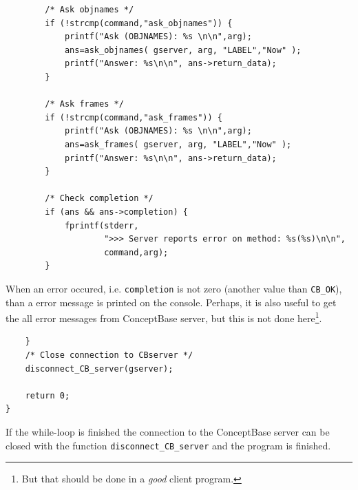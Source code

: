 \begin{verbatim}
        /* Ask objnames */
        if (!strcmp(command,"ask_objnames")) {
            printf("Ask (OBJNAMES): %s \n\n",arg);
            ans=ask_objnames( gserver, arg, "LABEL","Now" );
            printf("Answer: %s\n\n", ans->return_data);
        }

        /* Ask frames */
        if (!strcmp(command,"ask_frames")) {
            printf("Ask (OBJNAMES): %s \n\n",arg);
            ans=ask_frames( gserver, arg, "LABEL","Now" );
            printf("Answer: %s\n\n", ans->return_data);
        }

        /* Check completion */
        if (ans && ans->completion) {
            fprintf(stderr,
                    ">>> Server reports error on method: %s(%s)\n\n",
                    command,arg);
        }
\end{verbatim}
When an error occured, i.e. {\tt completion} is not zero (another value than {\tt CB\_OK}),
than a error message is printed on the console. Perhaps, it is also useful to get the
all error messages from ConceptBase server, but this is not done here\footnote{But that
should be done in a {\em good} client program.}.
\begin{verbatim}
    }
    /* Close connection to CBserver */
    disconnect_CB_server(gserver);

    return 0;
}
\end{verbatim}
If the while-loop is finished the connection to the ConceptBase server can be
closed with the function \verb+disconnect_CB_server+ and the program is finished.

